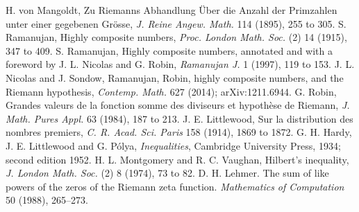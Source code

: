  H. von Mangoldt, Zu Riemanns Abhandlung \"Uber die Anzahl der Primzahlen unter einer gegebenen Gr\"osse, \emph{J. Reine Angew. Math.} 114 (1895), 255 to 305.
 S. Ramanujan, Highly composite numbers, \emph{Proc. London Math. Soc.} (2) 14 (1915), 347 to 409.
 S. Ramanujan, Highly composite numbers, annotated and with a foreword by J. L. Nicolas and G. Robin, \emph{Ramanujan J.} 1 (1997), 119 to 153.
 J. L. Nicolas and J. Sondow, Ramanujan, Robin, highly composite numbers, and the Riemann hypothesis, \emph{Contemp. Math.} 627 (2014); arXiv:1211.6944.
 G. Robin, Grandes valeurs de la fonction somme des diviseurs et hypoth\`ese de Riemann, \emph{J. Math. Pures Appl.} 63 (1984), 187 to 213.
 J. E. Littlewood, Sur la distribution des nombres premiers, \emph{C. R. Acad. Sci. Paris} 158 (1914), 1869 to 1872.
 G. H. Hardy, J. E. Littlewood and G. P\'olya, \emph{Inequalities}, Cambridge University Press, 1934; second edition 1952.
 H. L. Montgomery and R. C. Vaughan, Hilbert's inequality, \emph{J. London Math. Soc.} (2) 8 (1974), 73 to 82.
 D. H. Lehmer. The sum of like powers of the zeros of the Riemann zeta function. \emph{Mathematics of Computation} 50 (1988), 265--273.
